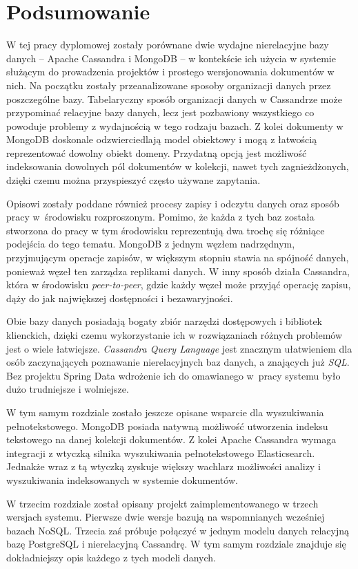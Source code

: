 \chapter{Podsumowanie}

W tej pracy dyplomowej zostały porównane dwie wydajne nierelacyjne bazy danych -- Apache Cassandra i MongoDB -- w kontekście ich użycia w systemie służącym do prowadzenia projektów i prostego wersjonowania dokumentów w nich.
Na początku zostały przeanalizowane sposoby organizacji danych przez poszczególne bazy.
Tabelaryczny sposób organizacji danych w Cassandrze może przypominać relacyjne bazy danych, lecz jest pozbawiony wszystkiego co powoduje problemy z wydajnością w tego rodzaju bazach.
Z kolei dokumenty w MongoDB doskonale odzwierciedlają model obiektowy i mogą z łatwością reprezentować dowolny obiekt domeny.
Przydatną opcją jest możliwość indeksowania dowolnych pól dokumentów w kolekcji, nawet tych zagnieżdżonych, dzięki czemu można przyspieszyć często używane zapytania.

Opisowi zostały poddane również procesy zapisy i odczytu danych oraz sposób pracy w~środowisku rozproszonym.
Pomimo, że każda z tych baz została stworzona do pracy w tym środowisku reprezentują dwa trochę się różniące podejścia do tego tematu.
MongoDB z jednym węzłem nadrzędnym, przyjmującym operacje zapisów, w większym stopniu stawia na spójność danych, ponieważ węzeł ten zarządza replikami danych.
W inny sposób działa Cassandra, która w środowisku \textit{peer-to-peer}, gdzie każdy węzeł może przyjąć operację zapisu, dąży do jak największej dostępności i bezawaryjności.

Obie bazy danych posiadają bogaty zbiór narzędzi dostępowych i bibliotek klienckich, dzięki czemu wykorzystanie ich w rozwiązaniach różnych problemów jest o wiele łatwiejsze.
\textit{Cassandra Query Language} jest znacznym ułatwieniem dla osób zaczynających poznawanie nierelacyjnych baz danych, a znających już \textit{SQL}.
Bez projektu Spring Data wdrożenie ich do omawianego w~pracy systemu było dużo trudniejsze i wolniejsze.

W tym samym rozdziale zostało jeszcze opisane wsparcie dla wyszukiwania pełnotekstowego. 
MongoDB posiada natywną możliwość utworzenia indeksu tekstowego na danej kolekcji dokumentów.
Z kolei Apache Cassandra wymaga integracji z wtyczką silnika wyszukiwania pełnotekstowego Elasticsearch.
Jednakże wraz z tą wtyczką zyskuje większy wachlarz możliwości analizy i wyszukiwania indeksowanych w systemie dokumentów.

W trzecim rozdziale został opisany projekt zaimplementowanego w trzech wersjach systemu.
Pierwsze dwie wersje bazują na wspomnianych wcześniej bazach NoSQL.
Trzecia zaś próbuje połączyć w jednym modelu danych relacyjną bazę PostgreSQL i nierelacyjną Cassandrę.
W tym samym rozdziale znajduje się dokładniejszy opis każdego z tych modeli danych.

